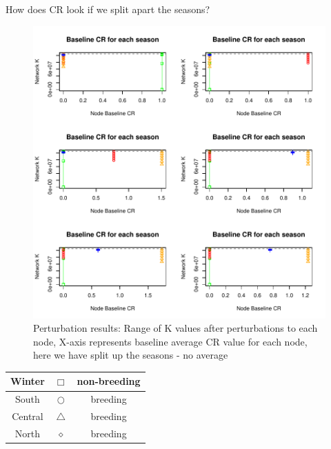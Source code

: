 \documentclass[10pt]{article}
\begin{document}
How does CR look if we split apart the seasons?


\vspace{-.5cm}
\begin{figure}[H]
\begin{center}
\includegraphics[width=.8\textwidth, height=.8\textwidth]{RGraphics-monarch_barcr_CRseasons}
\caption{Perturbation results: Range of K values after perturbations to each node, X-axis represents baseline average CR value for each node, here we have split up the seasons - no average}\label{fig:monarch_barcr_WR}
\end{center}
\end{figure}

\vspace{-.5cm}
\begin{tabular}{|c|c|c|}
\hline
{\color{green}Winter} & $\Box$ & non-breeding \\
\hline
{\color{red}South} & $\bigcirc$ & breeding \\
\hline
{\color{orange}Central} & $\triangle$ & breeding \\
\hline
{\color{blue}North} & $\diamond$ & breeding \\
\hline
\end{tabular}
\end{document}
